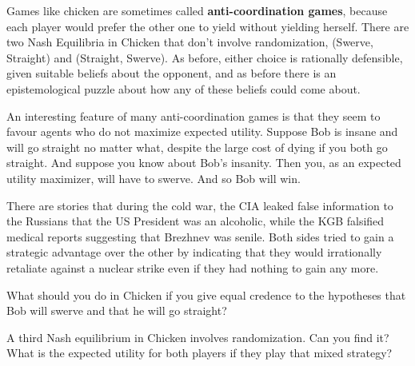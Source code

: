 Games like chicken are sometimes called \textbf{anti-coordination
  games}, because each player would prefer the other one to yield
without yielding herself.  There are two Nash Equilibria in Chicken
that don't involve randomization, (Swerve, Straight) and (Straight,
Swerve). As before, either choice is rationally defensible, given
suitable beliefs about the opponent, and as before there is an
epistemological puzzle about how any of these beliefs could come
about.

An interesting feature of many anti-coordination games is that they
seem to favour agents who do not maximize expected utility. Suppose
Bob is insane and will go straight no matter what, despite the large
cost of dying if you both go straight. And suppose you know about
Bob's insanity. Then you, as an expected utility maximizer, will have
to swerve. And so Bob will win.

There are stories that during the cold war, the CIA leaked false
information to the Russians that the US President was an alcoholic,
while the KGB falsified medical reports suggesting that Brezhnev was
senile. Both sides tried to gain a strategic advantage over the other
by indicating that they would irrationally retaliate against a nuclear
strike even if they had nothing to gain any more.

\begin{exercise}{1}
  What should you do in Chicken if you give equal credence to the
  hypotheses that Bob will swerve and that he will go straight?
\end{exercise}

\begin{exercise}{3}
  A third Nash equilibrium in Chicken involves randomization. Can you
  find it?  What is the expected utility for both players if they play
  that mixed strategy?  
\end{exercise}



